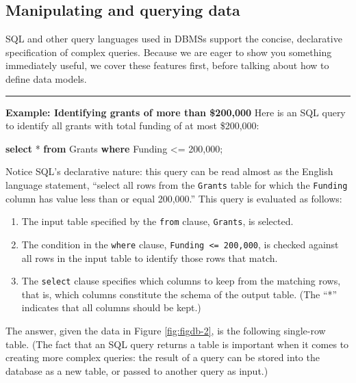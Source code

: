 \documentclass[]{krantz}
\newenvironment{Shaded}{\begin{snugshade}}{\end{snugshade}}
\newcommand{\KeywordTok}[1]{\textcolor[rgb]{0.13,0.29,0.53}{\textbf{#1}}}
\newcommand{\DecValTok}[1]{\textcolor[rgb]{0.00,0.00,0.81}{#1}}
\newcommand{\NormalTok}[1]{#1}
\begin{document}
\hypertarget{sec:db:sql}{\subsection{Manipulating and querying
data}\label{sec:db:sql}}

SQL and other query languages used in DBMSs support the concise,
declarative specification of complex queries. Because we are eager to
show you something immediately useful, we cover these features first,
before talking about how to define data models.

\begin{center}\rule{0.5\linewidth}{\linethickness}\end{center}

\textbf{Example: Identifying grants of more than \$200,000} Here is an
SQL query to identify all grants with total funding of at most
\$200,000:

\begin{Shaded}
\begin{Highlighting}[]
\KeywordTok{select}\NormalTok{ * }\KeywordTok{from}\NormalTok{ Grants}
\KeywordTok{where}\NormalTok{ Funding <= }\DecValTok{200}\NormalTok{,}\DecValTok{000}\NormalTok{;}
\end{Highlighting}
\end{Shaded}

Notice SQL's declarative nature: this query can be read almost as the
English language statement, ``select all rows from the \texttt{Grants}
table for which the \texttt{Funding} column has value less than or equal
200,000.'' This query is evaluated as follows:

\begin{enumerate}
\def\labelenumi{\arabic{enumi}.}
\item
  The input table specified by the \texttt{from} clause,
  \texttt{Grants}, is selected.
\item
  The condition in the \texttt{where} clause,
  \texttt{Funding\ \textless{}=\ 200,000}, is checked against all rows
  in the input table to identify those rows that match.
\item
  The \texttt{select} clause specifies which columns to keep from the
  matching rows, that is, which columns constitute the schema of the
  output table. (The ``*'' indicates that all columns should be kept.)
\end{enumerate}

The answer, given the data in Figure \ref{fig:figdb-2}, is the following
single-row table. (The fact that an SQL query returns a table is
important when it comes to creating more complex queries: the result of
a query can be stored into the database as a new table, or passed to
another query as input.)
\end{document}

